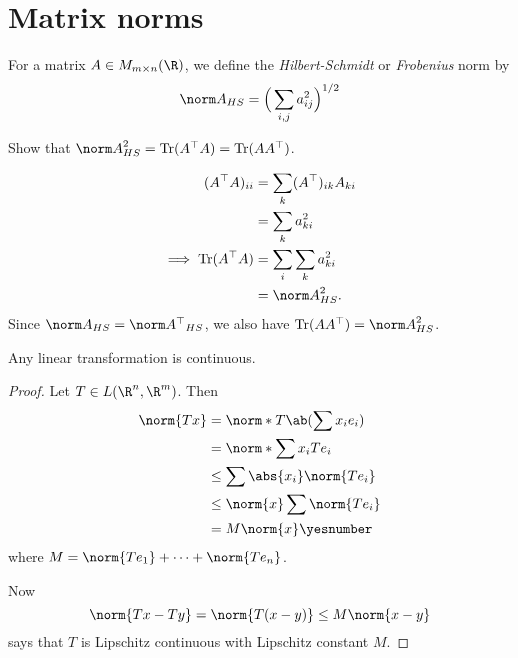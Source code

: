 \begin{exercise}
    
\end{exercise}

\section{Matrix norms} \label{sec:matrix-norms}

\begin{definition*} \label{def:hsn}
    For a matrix $A \in M_{m \times n}(\R)$, we define the
    \emph{Hilbert-Schmidt} or \emph{Frobenius} norm by \[
        \hsn A = \Big(\sum_{i,j} a_{ij}^2\Big)^{1/2}
    \]
\end{definition*}

\begin{exercise}
    Show that $\hsn A^2 = \Tr(A^\T A) = \Tr(AA^\T)$.
\end{exercise}
\begin{solution}
    \begin{align*}
        (A^\T A)_{i i} &= \sum_k (A^\T)_{i k} A_{k i} \\
            &= \sum_k a_{k i}^2 \\
        \implies \Tr(A^\T A) &= \sum_i \sum_k a_{k i}^2 \\
            &= \hsn A^2.
    \end{align*}
    Since $\hsn A = \hsn{A^\T}$, we also have $\Tr(AA^\T) = \hsn A^2$.
\end{solution}
\begin{proposition}
    Any linear transformation is continuous.
\end{proposition}
\begin{proof}
    Let $T \in L(\R^n, \R^m)$.
    Then \begin{align*}
        \norm{Tx} &= \norm*{T\ab(\sum x_i e_i)} \\
                 &= \norm*{\sum x_i Te_i} \\
                 &\le \sum \abs{x_i} \norm{T e_i} \\
                 &\le \norm{x} \sum \norm{T e_i} \\
                 &= M \norm{x} \yesnumber \label{eq:operator_norm}
    \end{align*} where $M = \norm{Te_1} + \cdots + \norm{Te_n}$.

    Now \[
        \norm{Tx - Ty} = \norm{T(x - y)} \le M \norm{x - y}
    \] says that $T$ is Lipschitz continuous with Lipschitz constant $M$.
\end{proof}

